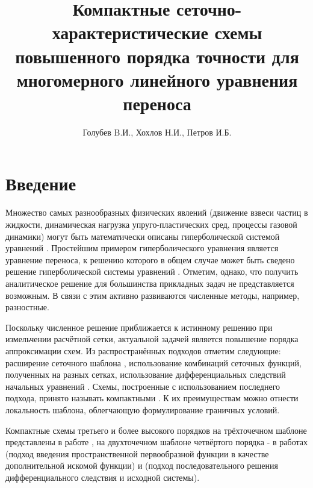 \documentclass[11pt]{article}
\title{Компактные сеточно-характеристические схемы повышенного порядка точности для многомерного линейного уравнения переноса}
\date{}
\author{Голубев B.И., Хохлов Н.И., Петров И.Б.}
\begin{document}
\maketitle

\section{Введение}

Множество самых разнообразных физических явлений (движение взвеси частиц в жидкости, динамическая нагрузка упруго-пластических сред, процессы газовой динамики) могут быть математически описаны гиперболической системой уравнений \cite{Kholodov2008}.
Простейшим примером гиперболического уравнения является уравнение переноса, к решению которого в общем случае может быть сведено решение гиперболической системы уравнений \cite{Magometov-Kholodov-1969, Yanenko1978}.
Отметим, однако, что получить аналитическое решение для большинства прикладных задач не представляется возможным.
В связи с этим активно развиваются численные методы, например, разностные.

Поскольку численное решение приближается к истинному решению при измельчении расчётной сетки, актуальной задачей является повышение порядка аппроксимации схем.
Из распространённых подходов отметим следующие: расширение сеточного шаблона \cite{Rusanov1961}, использование комбинаций сеточных функций, полученных на разных сетках,
использование дифференциальных следствий начальных уравнений \cite{Courant1949, Khol2006, Grudn1977, Yanenko1978, Petuhov1964}.
Схемы, построенные с использованием последнего подхода, принято называть компактными \cite{Tolstih1990}.
К их преимуществам можно отнести локальность шаблона, облегчающую формулирование граничных условий.

Компактные схемы третьего и более высокого порядков на трёхточечном шаблоне представлены в работе \cite{Tolstih1990}, на двухточечном шаблоне четвёртого порядка - в работах \cite{Rogov2011} (подход введения пространственной первообразной функции в качестве дополнительной искомой функции) и \cite{Khol2006} (подход последовательного решения дифференциального следствия и исходной системы).
\end{document}
